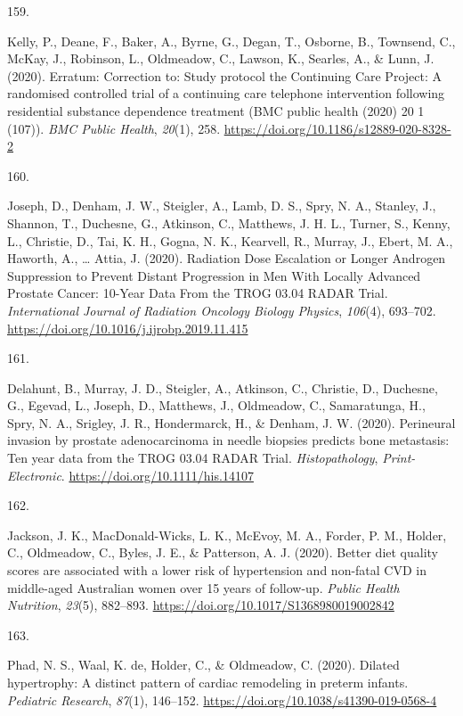 \documentclass[11pt, a4paper]{awesome-cv}
\newlength{\csllabelwidth}
\newcommand{\CSLLeftMargin}[1]{\parbox[t]{\csllabelwidth}{#1}}
\newcommand{\CSLRightInline}[1]{\parbox[t]{\linewidth - \csllabelwidth}{#1}}
\begin{document}
\leavevmode\hypertarget{ref-kelly_erratum_2020}{}%
\CSLLeftMargin{159. }
\CSLRightInline{Kelly, P., Deane, F., Baker, A., Byrne, G., Degan, T.,
Osborne, B., Townsend, C., McKay, J., Robinson, L., Oldmeadow, C.,
Lawson, K., Searles, A., \& Lunn, J. (2020). Erratum: Correction to:
Study protocol the Continuing Care Project: A randomised controlled
trial of a continuing care telephone intervention following residential
substance dependence treatment (BMC public health (2020) 20 1 (107)).
\emph{BMC Public Health}, \emph{20}(1), 258.
\url{https://doi.org/10.1186/s12889-020-8328-2}}

\leavevmode\hypertarget{ref-joseph_radiation_2020}{}%
\CSLLeftMargin{160. }
\CSLRightInline{Joseph, D., Denham, J. W., Steigler, A., Lamb, D. S.,
Spry, N. A., Stanley, J., Shannon, T., Duchesne, G., Atkinson, C.,
Matthews, J. H. L., Turner, S., Kenny, L., Christie, D., Tai, K. H.,
Gogna, N. K., Kearvell, R., Murray, J., Ebert, M. A., Haworth, A.,
\ldots{} Attia, J. (2020). Radiation Dose Escalation or Longer Androgen
Suppression to Prevent Distant Progression in Men With Locally Advanced
Prostate Cancer: 10-Year Data From the TROG 03.04 RADAR Trial.
\emph{International Journal of Radiation Oncology Biology Physics},
\emph{106}(4), 693--702.
\url{https://doi.org/10.1016/j.ijrobp.2019.11.415}}

\leavevmode\hypertarget{ref-delahunt_perineural_2020}{}%
\CSLLeftMargin{161. }
\CSLRightInline{Delahunt, B., Murray, J. D., Steigler, A., Atkinson, C.,
Christie, D., Duchesne, G., Egevad, L., Joseph, D., Matthews, J.,
Oldmeadow, C., Samaratunga, H., Spry, N. A., Srigley, J. R.,
Hondermarck, H., \& Denham, J. W. (2020). Perineural invasion by
prostate adenocarcinoma in needle biopsies predicts bone metastasis: Ten
year data from the TROG 03.04 RADAR Trial. \emph{Histopathology},
\emph{Print-Electronic}. \url{https://doi.org/10.1111/his.14107}}

\leavevmode\hypertarget{ref-jackson_better_2020}{}%
\CSLLeftMargin{162. }
\CSLRightInline{Jackson, J. K., MacDonald-Wicks, L. K., McEvoy, M. A.,
Forder, P. M., Holder, C., Oldmeadow, C., Byles, J. E., \& Patterson, A.
J. (2020). Better diet quality scores are associated with a lower risk
of hypertension and non-fatal CVD in middle-aged Australian women over
15 years of follow-up. \emph{Public Health Nutrition}, \emph{23}(5),
882--893. \url{https://doi.org/10.1017/S1368980019002842}}

\leavevmode\hypertarget{ref-phad_dilated_2020}{}%
\CSLLeftMargin{163. }
\CSLRightInline{Phad, N. S., Waal, K. de, Holder, C., \& Oldmeadow, C.
(2020). Dilated hypertrophy: A distinct pattern of cardiac remodeling in
preterm infants. \emph{Pediatric Research}, \emph{87}(1), 146--152.
\url{https://doi.org/10.1038/s41390-019-0568-4}}
\end{document}
